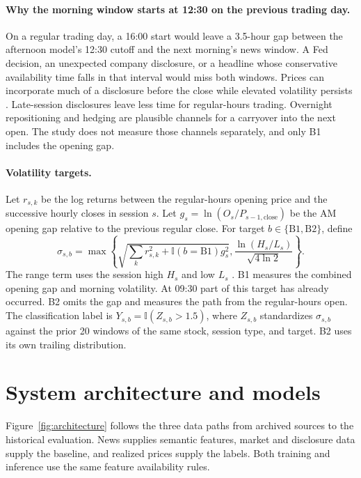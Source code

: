 \documentclass{article}
\begin{document}
\paragraph{Why the morning window starts at 12:30 on the previous trading day.}
On a regular trading day, a 16:00 start would leave a 3.5-hour gap between the afternoon model's 12:30 cutoff and the next morning's news window. A Fed decision, an unexpected company disclosure, or a headline whose conservative availability time falls in that interval would miss both windows. Prices can incorporate much of a disclosure before the close while elevated volatility persists \citep{engle1982autoregressive}. Late-session disclosures leave less time for regular-hours trading. Overnight repositioning and hedging are plausible channels for a carryover into the next open. The study does not measure those channels separately, and only B1 includes the opening gap.

\paragraph{Volatility targets.}
Let $r_{s,k}$ be the log returns between the regular-hours opening price and the successive hourly closes in session $s$. Let $g_s=\ln(O_s/P_{s-1,\mathrm{close}})$ be the AM opening gap relative to the previous regular close. For target $b\in\{\mathrm{B1},\mathrm{B2}\}$, define
\begin{equation}
 \sigma_{s,b} =
 \max\left\{
 \sqrt{\sum_{k}r_{s,k}^{2}+\mathbb{I}(b=\mathrm{B1})g_s^2},
 \frac{\ln(H_s/L_s)}{\sqrt{4\ln 2}}
 \right\}.
 \label{eq:sigma}
\end{equation}
The range term uses the session high $H_s$ and low $L_s$ \citep{parkinson1980extreme}. B1 measures the combined opening gap and morning volatility. At 09:30 part of this target has already occurred. B2 omits the gap and measures the path from the regular-hours open. The classification label is $Y_{s,b}=\mathbb{I}(Z_{s,b}>1.5)$, where $Z_{s,b}$ standardizes $\sigma_{s,b}$ against the prior 20 windows of the same stock, session type, and target. B2 uses its own trailing distribution.

\section{System architecture and models}
\label{sec:method}

Figure~\ref{fig:architecture} follows the three data paths from archived sources to the historical evaluation. News supplies semantic features, market and disclosure data supply the baseline, and realized prices supply the labels. Both training and inference use the same feature availability rules.
\end{document}
